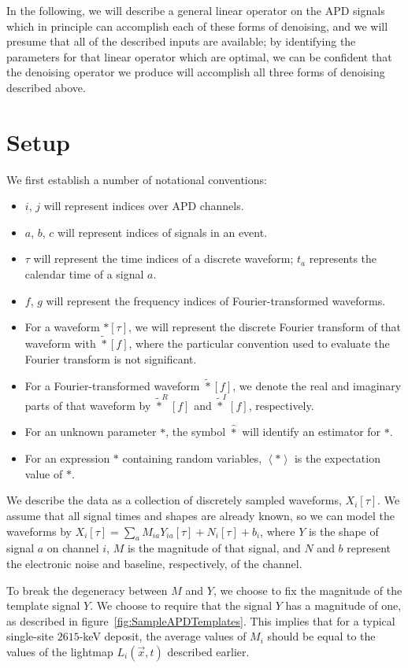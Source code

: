 In the following, we will describe a general linear operator on the APD signals which in principle can accomplish each of these forms of denoising, and we will presume that all of the described inputs are available; by identifying the parameters for that linear operator which are optimal, we can be confident that the denoising operator we produce will accomplish all three forms of denoising described above.

\section{Setup}

We first establish a number of notational conventions:
\begin{itemize}
\item $i$, $j$ will represent indices over APD channels.
\item $a$, $b$, $c$ will represent indices of signals in an event.
\item $\tau$ will represent the time indices of a discrete waveform; $t_a$ represents the calendar time of a signal $a$.
\item $f$, $g$ will represent the frequency indices of Fourier-transformed waveforms.
\item For a waveform $*[\tau]$, we will represent the discrete Fourier transform of that waveform with $\widetilde{*}[f]$, where the particular convention used to evaluate the Fourier transform is not significant.
\item For a Fourier-transformed waveform $\widetilde{*}[f]$, we denote the real and imaginary parts of that waveform by $\widetilde{*}^R[f]$ and $\widetilde{*}^I[f]$, respectively.
\item For an unknown parameter $*$, the symbol $\widehat{*}$ will identify an estimator for $*$.
\item For an expression $*$ containing random variables, $\left<*\right>$ is the expectation value of $*$.
\end{itemize}

We describe the data as a collection of discretely sampled waveforms, $X_i[\tau]$.  We assume that all signal times and shapes are already known, so we can model the waveforms by $X_i[\tau] = \sum_a M_{ia}Y_{ia}[\tau] + N_i[\tau] + b_i$, where $Y$ is the shape of signal $a$ on channel $i$, $M$ is the magnitude of that signal, and $N$ and $b$ represent the electronic noise and baseline, respectively, of the channel.

To break the degeneracy between $M$ and $Y$, we choose to fix the magnitude of the template signal $Y$.  We choose to require that the signal $Y$ has a magnitude of one, as described in figure~\ref{fig:SampleAPDTemplates}.  This implies that for a typical single-site $2615$-keV deposit, the average values of $M_i$ should be equal to the values of the lightmap $L_i(\vec{x},t)$ described earlier.

